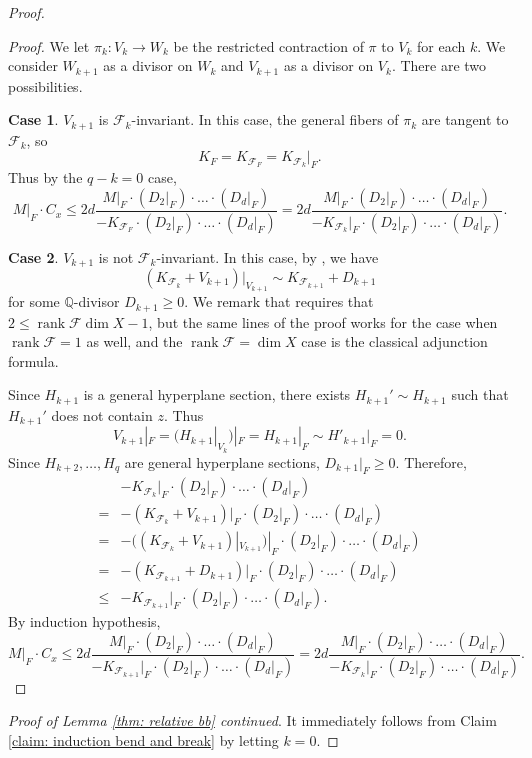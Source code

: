 \documentclass[11pt]{amsart}
\numberwithin{equation}{section}
\newcommand{\Qq}{\mathbb{Q}}
\newcommand{\rk}{\operatorname{rank}}
\newcommand{\Ff}{\mathcal{F}}
\theoremstyle{definition}
\theoremstyle{definition}
\theoremstyle{definition}
\begin{document}
\begin{proof}
\begin{proof}
    We let $\pi_k: V_k\rightarrow W_k$ be the restricted contraction of $\pi$ to $V_k$ for each $k$. We consider $W_{k+1}$ as a divisor on $W_k$ and $V_{k+1}$ as a divisor on $V_k$. There are two possibilities.

\medskip

\noindent\textbf{Case 1}. $V_{k+1}$ is $\Ff_k$-invariant. In this case, the general fibers of $\pi_k$ are tangent to $\Ff_k$, so 
$$K_F=K_{\Ff_F}=K_{\Ff_k}|_F.$$
Thus by the $q-k=0$ case,
$$M|_F\cdot C_x\leq2d\frac{M|_F\cdot  (D_2|_F)\cdot\dots\cdot (D_d|_F)}{-K_{\Ff_F}\cdot  (D_2|_F)\cdot\dots\cdot (D_d|_F)}=2d\frac{M|_F\cdot  (D_2|_F)\cdot\dots\cdot (D_d|_F)}{-K_{\Ff_k}|_F\cdot  (D_2|_F)\cdot\dots\cdot (D_d|_F)}.$$

\medskip

\noindent\textbf{Case 2}. $V_{k+1}$ is not $\Ff_k$-invariant. In this case, by \cite[Proposition 3.6(1)]{Dru21}, we have
$$(K_{\Ff_k}+V_{k+1})|_{V_{k+1}}\sim K_{\Ff_{k+1}}+D_{k+1}$$
for some $\Qq$-divisor $D_{k+1}\geq 0$.  We remark that \cite[Proposition 3.6(1)]{Dru21} requires that $2\leq \rk\Ff\dim X-1$, but the same lines of the proof works for the case when $\rk\Ff=1$ as well, and the $\rk\Ff=\dim X$ case is the classical adjunction formula.

Since $H_{k+1}$ is a general hyperplane section, there exists $H_{k+1}'\sim H_{k+1}$ such that $H_{k+1}'$ does not contain $z$. Thus
$$V_{k+1}|_F=(H_{k+1}|_{V_k})|_F=H_{k+1}|_F\sim H'_{k+1}|_F=0.$$
Since $H_{k+2},\dots,H_q$ are general hyperplane sections, $D_{k+1}|_F\geq 0$. Therefore,
\begin{align*}
    &-K_{\Ff_k}|_F\cdot  (D_2|_F)\cdot\dots\cdot (D_d|_F)\\
    =&-(K_{\Ff_k}+V_{k+1})|_F\cdot  (D_2|_F)\cdot\dots\cdot (D_d|_F)\\
    =&-((K_{\Ff_k}+V_{k+1})|_{V_{k+1}})|_F\cdot  (D_2|_F)\cdot\dots\cdot (D_d|_F)\\
    =&-(K_{\Ff_{k+1}}+D_{k+1})|_F\cdot  (D_2|_F)\cdot\dots\cdot (D_d|_F)\\
    \leq&-K_{\Ff_{k+1}}|_F\cdot  (D_2|_F)\cdot\dots\cdot (D_d|_F).
\end{align*}
By induction hypothesis,
$$M|_F\cdot C_x\leq2d\frac{M|_F\cdot  (D_2|_F)\cdot\dots\cdot (D_d|_F)}{-K_{\Ff_{k+1}}|_F\cdot  (D_2|_F)\cdot\dots\cdot (D_d|_F)}=2d\frac{M|_F\cdot  (D_2|_F)\cdot\dots\cdot (D_d|_F)}{-K_{\Ff_k}|_F\cdot  (D_2|_F)\cdot\dots\cdot (D_d|_F)}.$$
\end{proof}
\noindent\textit{Proof of Lemma \ref{thm: relative bb} continued}. It immediately follows from Claim \ref{claim: induction bend and break} by letting $k=0$.
\end{proof}
\end{document}
